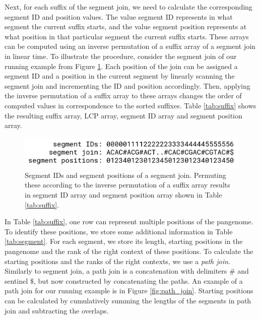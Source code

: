 Next, for each suffix of the segment join, we need to calculate the corresponding segment ID and position values.
The value segment ID represents in what segment the current suffix starts, and the value segment position represents at what position in that particular segment the current suffix starts.
These arrays can be computed using an inverse permutation of a suffix array of a segment join in linear time.
To illustrate the procedure, consider the segment join of our running example from Figure \ref{fig:ids_and_positions}.
Each position of the join can be assigned a segment ID and a position in the current segment by linearly scanning the segment join and incrementing the ID and position accordingly.
Then, applying the inverse permutation of a suffix array to these arrays changes the order of computed values in correspondence to the sorted suffixes.
Table \ref{tab:suffix} shows the resulting suffix array, LCP array,
segment ID array and segment position array.

\begin{figure}
    \centering
    \includegraphics[width=\linewidth]{images/ids_and_positions.png}
    \caption{
        Segment IDs and segment positions of a segment join. 
        Permuting these according to the inverse permutation of a suffix array results in segment ID array and segment position array shown in Table \ref{tab:suffix}.
    }
    \label{fig:ids_and_positions}
\end{figure}



In Table \ref{tab:suffix}, one row can represent multiple positions of the
pangenome.
To identify these positions, we store some additional information in Table \ref{tab:segment}.
For each segment, we store its length, starting positions in the pangenome and the rank of the right context of these positions.
To calculate the starting positions and the ranks of the right contexts, we use a \emph{path join}.
Similarly to segment join, a path join is a concatenation with delimiters $\#$ and sentinel $\$$, but now constructed by concatenating the paths.
An example of a path join for our running example is in Figure \ref{fig:path_join}.
Starting positions can be calculated by cumulatively summing the lengths
of the segments in path join and subtracting the overlaps.

